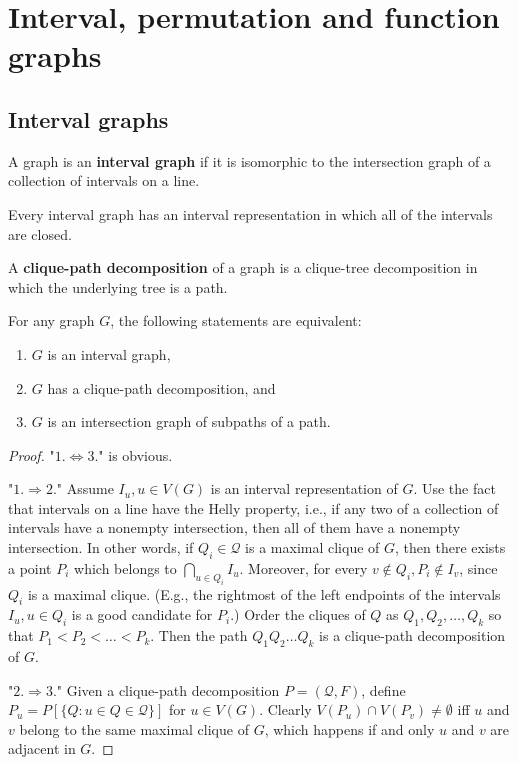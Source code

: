 \chapter{Interval, permutation and function graphs}

\section{Interval graphs}

\begin{defn}
	A graph is an \textbf{interval graph} if it is isomorphic to the intersection graph of a collection of intervals on a line.
\end{defn}

\begin{observ}
	Every interval graph has an interval representation in which all of the intervals are closed.
\end{observ}

\begin{defn}
	A \textbf{clique-path decomposition} of a graph is a clique-tree decomposition in which the underlying tree is a path.
\end{defn}

\begin{thm}
	For any graph $G$, the following statements are equivalent:
	
	\begin{enumerate}
		\item $G$ is an interval graph,
		\item $G$ has a clique-path decomposition, and
		\item $G$ is an intersection graph of subpaths of a path.
	\end{enumerate}
\end{thm}

\begin{proof}
	"$1. \Leftrightarrow 3.$" is obvious.
	
	"$1. \Rightarrow 2.$" Assume $I_u , u \in V(G)$ is an interval representation of $G$. Use the fact that intervals on a line have the Helly property, i.e., if any two of a collection of intervals have a nonempty intersection, then all of them have a nonempty intersection. In other words, if $Q_i \in \mathcal{Q}$ is a maximal clique of $G$, then there exists a point $P_i$ which belongs to $\bigcap_{u \in Q_i} I_u$. Moreover, for every $v \notin Q_i , P_i \notin I_v$, since $Q_i$ is a maximal clique. (E.g., the rightmost of the left endpoints of the intervals $I_u , u \in Q_i$ is a good candidate for $P_i$.) Order the cliques of $Q$ as $Q_1, Q_2, \dots, Q_k$ so that $P_1 < P_2 < \dots < P_k$. Then the path
	$Q_1 Q_2 \dots Q_k$ is a clique-path decomposition of $G$.
	
	"$2. \Rightarrow 3.$" Given a clique-path decomposition $P = (\mathcal{Q}, F)$, define $P_u = P [\{Q : u \in Q \in \mathcal{Q}\}]$ for $u \in V(G)$. Clearly $V(P_u) \cap V(P_v) \neq \emptyset$ iff $u$ and $v$ belong to the same maximal clique of $G$, which happens if and only $u$ and $v$ are adjacent in $G$.
\end{proof}

